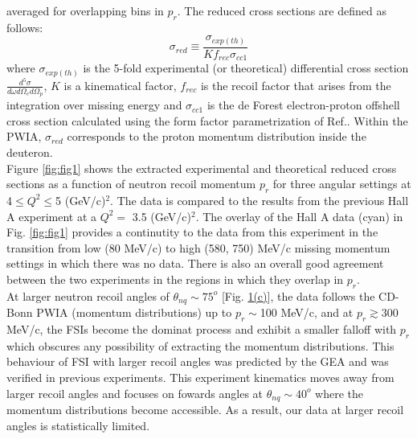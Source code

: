 \twocolumngrid
\noindent averaged for overlapping bins in $p_{r}$. The reduced cross sections are defined as follows:
\begin{equation}
\sigma_{red} \equiv \frac{\sigma_{exp(th)}}{Kf_{rec}\sigma_{cc1}}
\label{eq:1}
\end{equation}
where $\sigma_{exp(th)}$ is the 5-fold experimental (or theoretical) differential cross section $\frac{d^{5}\sigma}{d\omega d\Omega_{e} d\Omega_{p}}$, $K$ is a kinematical factor, $f_{rec}$ is the recoil factor that arises from the
integration over missing energy and $\sigma_{cc1}$ is the de Forest\cite{DEFOREST1983} electron-proton offshell cross section calculated using the form factor parametrization of Ref.\cite{PhysRevC.69.022201}.
Within the PWIA, $\sigma_{red}$ corresponds to the proton momentum distribution inside the deuteron. \\
\indent Figure \ref{fig:fig1} shows the extracted experimental and theoretical reduced cross sections as a function of neutron recoil momentum $p_{r}$ for three angular settings at 4$\leq Q^{2} \leq$5
(GeV/c)$^{2}$. The data is compared to the results from the previous Hall A experiment\cite{PhysRevLett.107.262501} at a $Q^{2}=$ 3.5 (GeV/c)$^{2}$.  The overlay of the Hall A data (cyan) in Fig. \ref{fig:fig1}
provides a continutity to the data from this experiment in the transition from low (80 MeV/c) to high (580, 750) MeV/c missing momentum settings in which there
was no data. There is also an overall good agreement between the two experiments in the regions in which they overlap in $p_{r}$. \\
\indent At larger neutron recoil angles of $\theta_{nq}\sim75^{o}$ [Fig. \hyperref[fig:fig1]{1(c)}], the data follows the CD-Bonn PWIA (momentum distributions) up to $p_{r}\sim $100 MeV/c, and at $p_{r}\gtrsim$300 MeV/c, the FSIs become the dominat process and exhibit a
smaller falloff with $p_{r}$ which obscures any possibility of extracting the momentum distributions. This behaviour of FSI with larger recoil angles was predicted by the GEA\cite{Sargsian_2001,PhysRevC.56.1124} and was verified in previous experiments\cite{PhysRevLett.107.262501,PhysRevLett.98.262502}.
This experiment kinematics moves away from larger recoil angles and focuses on fowards angles at $\theta_{nq}\sim 40^{o}$ where the momentum distributions become accessible. As a result, our data at larger recoil angles
is statistically limited. \\
